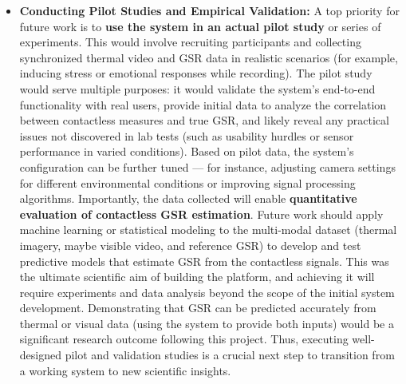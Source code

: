 \begin{itemize}
\item \textbf{Conducting Pilot Studies and Empirical Validation:} A top priority
  for future work is to \textbf{use the system in an actual pilot study} or
  series of experiments. This would involve recruiting participants and
  collecting synchronized thermal video and GSR data in realistic
  scenarios (for example, inducing stress or emotional responses while
  recording). The pilot study would serve multiple purposes: it would
  validate the system's end-to-end functionality with real users,
  provide initial data to analyze the correlation between contactless
  measures and true GSR, and likely reveal any practical issues not
  discovered in lab tests (such as usability hurdles or sensor
  performance in varied conditions). Based on pilot data, the system's
  configuration can be further tuned --- for instance, adjusting camera
  settings for different environmental conditions or improving signal
  processing algorithms. Importantly, the data collected will enable
  \textbf{quantitative evaluation of contactless GSR estimation}. Future work
  should apply machine learning or statistical modeling to the
  multi-modal dataset (thermal imagery, maybe visible video, and
  reference GSR) to develop and test predictive models that estimate GSR
  from the contactless signals. This was the ultimate scientific aim of
  building the platform, and achieving it will require experiments and
  data analysis beyond the scope of the initial system development.
  Demonstrating that GSR can be predicted accurately from thermal or
  visual data (using the system to provide both inputs) would be a
  significant research outcome following this project. Thus, executing
  well-designed pilot and validation studies is a crucial next step to
  transition from a working system to new scientific insights.


\end{itemize}
